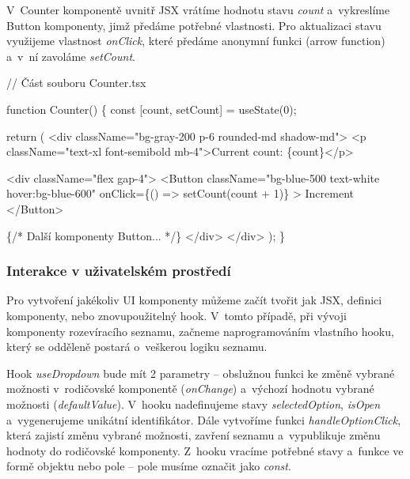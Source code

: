 V~Counter komponentě uvnitř JSX vrátíme hodnotu stavu \emph{count} a~vykreslíme Button komponenty, jimž předáme potřebné vlastnosti. 
Pro aktualizaci stavu využijeme vlastnost \emph{onClick}, které předáme anonymní funkci (arrow function) a~v~ní zavoláme \emph{setCount}.

\begin{prog}
// Část souboru Counter.tsx

function Counter() \{
  const [count, setCount] = useState(0);

  return (
    <div className="bg-gray-200 p-6 rounded-md shadow-md">
      <p className="text-xl font-semibold mb-4">Current count: \{count\}</p>

      <div className="flex gap-4">
        <Button
          className="bg-blue-500 text-white hover:bg-blue-600"
          onClick=\{() => setCount(count + 1)\}
        >
          Increment
        </Button>

        \{/* Další komponenty Button... */\}
      </div>
    </div>
  );
\}
\end{prog}

\subsubsection*{Interakce v uživatelském prostředí}

Pro vytvoření jakékoliv UI komponenty můžeme začít tvořit jak JSX, definici komponenty, nebo znovupoužitelný hook. 
V~tomto případě, při vývoji komponenty rozevíracího seznamu, začneme naprogramováním vlastního hooku, který se odděleně postará o~veškerou logiku seznamu.

Hook \emph{useDropdown} bude mít 2 parametry -- obslužnou funkci ke změně vybrané možnosti v~rodičovské komponentě (\emph{onChange}) a~výchozí hodnotu vybrané možnosti (\emph{defaultValue}). 
V~hooku nadefinujeme stavy \emph{selectedOption}, \emph{isOpen} a~vygenerujeme unikátní identifikátor. 
Dále vytvoříme funkci \emph{handleOptionClick}, která zajistí změnu vybrané možnosti, zavření seznamu a~vypublikuje změnu hodnoty do rodičovské komponenty. 
Z~hooku vracíme potřebné stavy a~funkce ve formě objektu nebo pole -- pole musíme označit jako \emph{const}.


